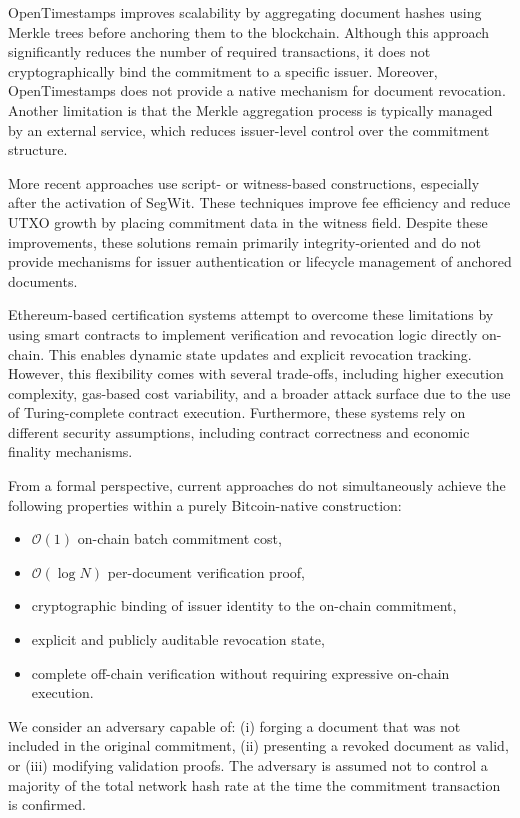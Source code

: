 \documentclass[preprint,12pt]{elsarticle}
\begin{document}
OpenTimestamps improves scalability by aggregating document hashes using Merkle trees before anchoring them to the blockchain. Although this approach significantly reduces the number of required transactions, it does not cryptographically bind the commitment to a specific issuer. Moreover, OpenTimestamps does not provide a native mechanism for document revocation. 
Another limitation is that the Merkle aggregation process is typically managed by an external service, which reduces issuer-level control over the commitment structure.

More recent approaches use script- or witness-based constructions, especially after the activation of SegWit. These techniques improve fee efficiency and reduce UTXO growth by placing commitment data in the witness field. Despite these improvements, these solutions remain primarily integrity-oriented and do not provide mechanisms for issuer authentication or lifecycle management of anchored documents.

Ethereum-based certification systems attempt to overcome these limitations by using smart contracts to implement verification and revocation logic directly on-chain. This enables dynamic state updates and explicit revocation tracking.  However, this flexibility comes with several trade-offs, including higher execution complexity, gas-based cost variability, and a broader attack surface due to the use of Turing-complete contract execution. Furthermore, these systems rely on different security assumptions, including contract correctness and economic finality mechanisms.

From a formal perspective, current approaches do not simultaneously achieve the following properties within a purely Bitcoin-native construction:

\begin{itemize}
    \item $\mathcal{O}(1)$ on-chain batch commitment cost,
    \item $\mathcal{O}(\log N)$ per-document verification proof,
    \item cryptographic binding of issuer identity to the on-chain commitment,
    \item explicit and publicly auditable revocation state,
    \item complete off-chain verification without requiring expressive on-chain execution.
\end{itemize}

We consider an adversary capable of: 
(i) forging a document that was not included in the original commitment, 
(ii) presenting a revoked document as valid, or 
(iii) modifying validation proofs. 
The adversary is assumed not to control a majority of the total network hash rate at the time the commitment transaction is confirmed.
\end{document}
